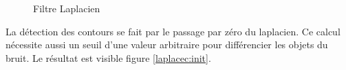 \documentclass{article}
\begin{document}
\begin{figure}[!ht]%
  \centering
  \hspace{0.030\textwidth}
  \caption{Filtre Laplacien}
  \label{laplace:init}
\end{figure}

La détection des contours se fait par le passage par zéro du laplacien. Ce calcul nécessite aussi un seuil d'une valeur
arbitraire pour différencier les objets du bruit. Le résultat est visible figure \ref{laplacec:init}.
\end{document}
